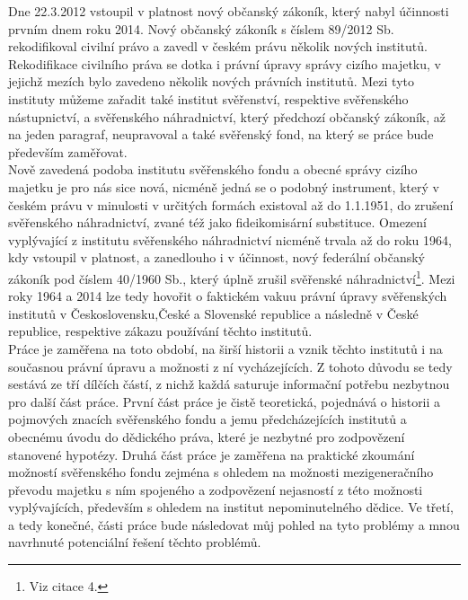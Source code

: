 \documentclass{article}
\begin{document}
\indent Dne 22.3.2012 vstoupil v platnost nový občanský zákoník, který nabyl účinnosti prvním dnem roku 2014. Nový občanský zákoník s číslem 89/2012 Sb. rekodifikoval civilní právo a zavedl v českém právu několik nových institutů. Rekodifikace civilního práva se dotka i právní úpravy správy cizího majetku, v jejichž mezích bylo zavedeno několik nových právních institutů. Mezi tyto instituty můžeme zařadit také institut svěřenství, respektive svěřenského nástupnictví, a svěřenského náhradnictví, který předchozí občanský zákoník, až na jeden paragraf, neupravoval a také svěřenský fond, na který se práce bude především zaměřovat. \\

\indent Nově zavedená podoba institutu svěřenského fondu a obecné správy cizího majetku je pro nás sice nová, nicméně jedná se o podobný instrument, který v českém právu v minulosti v určitých formách existoval až do 1.1.1951, do zrušení svěřens\-kého náhradnictví, zvané též jako fideikomisární substituce. Omezení vyplývající z institutu svěřenského náhradnictví nicméně trvala až do roku 1964, kdy vstoupil v platnost, a zanedlouho i v účinnost, nový federální občanský zákoník pod číslem 40/1960 Sb., který úplně zrušil svěřenské náhradnictví\footnote{Viz citace 4.}. Mezi roky 1964 a 2014 lze tedy hovořit o faktickém vakuu právní úpravy svěřen\-ských institutů v Československu,České a Slovenské republice a následně v České republice, respektive zákazu používání těchto institutů.\\

\indent Práce je zaměřena na toto období, na širší historii a vznik těchto institutů i na současnou právní úpravu a možnosti z ní vycházejících. Z tohoto důvodu se tedy sestává ze tří dílčích částí, z nichž každá saturuje informační potřebu nezbytnou pro další část práce. První část práce je čistě teoretická, pojednává o historii a pojmových znacích svěřenského fondu a jemu předcházejících institutů a obecnému úvodu do dědického práva, které je nezbytné pro zodpovězení stanovené hypotézy. Druhá část práce je zaměřena na praktické zkou\-mání možností svěřenského fondu zejména s ohledem na možnosti mezigeneračního převodu majetku s ním spojeného a zodpovězení nejasností z této možnosti vyplývajících, především s ohledem na institut nepominutelného dědice. Ve třetí, a tedy konečné, části práce bude následovat můj pohled na tyto problémy a mnou navrhnuté potenciální řešení těchto problémů. \\
\end{document}
